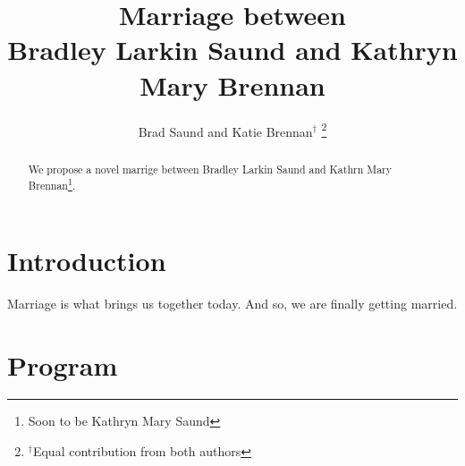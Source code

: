 \documentclass[letterpaper, 10 pt, conference]{ieeeconf}
\title{\LARGE \bf
  Marriage between \\
  Bradley Larkin Saund and Kathryn Mary Brennan
}
\author{Brad Saund and Katie Brennan$^{\dagger}$
\thanks{${^\dagger}$Equal contribution from both authors}%
}
\begin{document}
\maketitle
\thispagestyle{empty}
\pagestyle{empty}


\begin{abstract}
We propose a novel marrige between Bradley Larkin Saund and Kathrn Mary Brennan\footnote{Soon to be Kathryn Mary Saund}.
  
\end{abstract}


\section{Introduction}
Marriage is what brings us together today\cite{PrincessBride}.
And so, we are finally getting married\cite{AladdinKoT}.

\section{Program}



\end{document}
